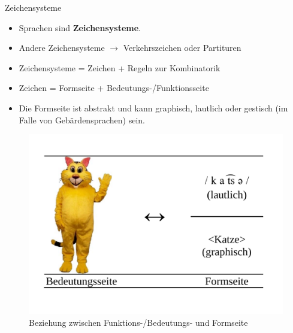 \begin{frame}{Zeichensysteme}
			
\begin{itemize}
	\item<1-> Sprachen sind \textbf{Zeichensysteme}.
	\item<1-> Andere Zeichensysteme $\rightarrow$ Verkehrszeichen oder Partituren
	\item<2-> Zeichensysteme = Zeichen + Regeln zur Kombinatorik
	\item<3-> Zeichen = Formseite + Bedeutungs-/Funktionsseite
	\item<3-> Die Formseite ist abstrakt und kann graphisch, lautlich oder gestisch (im Falle von Gebärdensprachen) sein.
\end{itemize}			
			
\begin{figure}[H]
\centering
				
\includegraphics[scale=0.15]{../material/01SSZeichenKatze}
\caption{Beziehung zwischen Funktions-/Bedeutungs- und Formseite}
\label{Zeichen1}
\end{figure}

\end{frame}			



